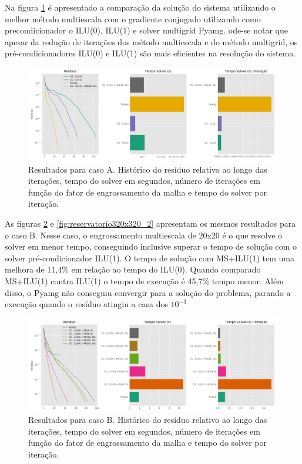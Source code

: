 Na figura \ref{fig:reservatorio100x100_2} é apresentado a comparação da solução do sistema utilizando o melhor método multiescala com o gradiente conjugado 
utilizando como precondicionador o ILU(0), ILU(1) e solver multigrid Pyamg. 
ode-se notar que apesar da redução de iterações dos método multiescala e do método multigrid, os pré-condicionadores ILU(0) e ILU(1) são mais eficientes na resolução do sistema. 


\begin{figure}[!htbp]
\label{fig:reservatorio100x100_2}
\centering
\includegraphics[width=\textwidth]{chap08/figs/reservatorio100x100_2.png}
\caption{Resultados para caso A. Histórico do resíduo relativo ao longo das iterações, tempo do solver em segundos, número de iterações em função do fator de engrossamento da malha e tempo do solver por iteração. }
\end{figure}


As figuras \ref{fig:reservatorio320x320_1} e \ref{fig:reservatorio320x320_2} apresentam os mesmos resultados para o caso B.
Nesse caso, o engrossamento multiescala de 20x20 é o que resolve o solver em menor tempo, conseguindo inclusive superar o tempo de solução com o solver pré-condicionador ILU(1).
O tempo de solução com MS+ILU(1) tem uma melhora de 11,4\% em relação ao tempo do ILU(0). Quando comparado MS+ILU(1) contra ILU(1) o tempo de execução é 45,7\% tempo menor.
Além disso, o Pyamg não conseguiu convergir para a solução do problema, parando a execução quando o resíduo atingiu a casa dos $10^{-3}$


\begin{figure}[!htbp]
\label{fig:reservatorio320x320_1}
\centering
\includegraphics[width=\textwidth]{chap08/figs/reservatorio320x320_1.png}
\caption{Resultados para caso B. Histórico do resíduo relativo ao longo das iterações, tempo do solver em segundos, número de iterações em função do fator de engrossamento da malha e tempo do solver por iteração. }
\end{figure}



